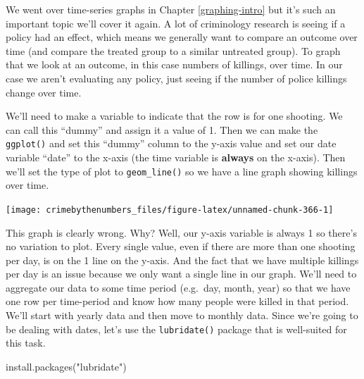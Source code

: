 \documentclass[
]{krantz}
\makeatletter
\newenvironment{Shaded}{\begin{snugshade}}{\end{snugshade}}
\newcommand{\AttributeTok}[1]{\textcolor[rgb]{0.61,0.61,0.61}{#1}}
\newcommand{\DecValTok}[1]{\textcolor[rgb]{0.06,0.06,0.06}{#1}}
\newcommand{\FunctionTok}[1]{\textcolor[rgb]{0,0,0}{#1}}
\newcommand{\NormalTok}[1]{#1}
\newcommand{\OtherTok}[1]{\textcolor[rgb]{0.37,0.37,0.37}{#1}}
\newcommand{\SpecialCharTok}[1]{\textcolor[rgb]{0,0,0}{#1}}
\newcommand{\StringTok}[1]{\textcolor[rgb]{0.5,0.5,0.5}{#1}}
\newenvironment{kframe}{%
\medskip{}
\setlength{\fboxsep}{.8em}
 \def\at@end@of@kframe{}%
 \ifinner\ifhmode%
  \def\at@end@of@kframe{\end{minipage}}%
  \begin{minipage}{\columnwidth}%
 \fi\fi%
 \def\FrameCommand##1{\hskip\@totalleftmargin \hskip-\fboxsep
 \colorbox{shadecolor}{##1}\hskip-\fboxsep
     \hskip-\linewidth \hskip-\@totalleftmargin \hskip\columnwidth}%
 \MakeFramed {\advance\hsize-\width
   \@totalleftmargin\z@ \linewidth\hsize
   \@setminipage}}%
 {\par\unskip\endMakeFramed%
 \at@end@of@kframe}
\renewenvironment{Shaded}{\begin{kframe}}{\end{kframe}}
\makeatother
\begin{document}
We went over time-series graphs in Chapter \ref{graphing-intro} but it's such an important topic we'll cover it again. A lot of criminology research is seeing if a policy had an effect, which means we generally want to compare an outcome over time (and compare the treated group to a similar untreated group). To graph that we look at an outcome, in this case numbers of killings, over time. In our case we aren't evaluating any policy, just seeing if the number of police killings change over time.

We'll need to make a variable to indicate that the row is for one shooting. We can call this ``dummy'' and assign it a value of 1. Then we can make the \texttt{ggplot()} and set this ``dummy'' column to the y-axis value and set our date variable ``date'' to the x-axis (the time variable is \textbf{always} on the x-axis). Then we'll set the type of plot to \texttt{geom\_line()} so we have a line graph showing killings over time.

\begin{Shaded}
\end{Shaded}

\begin{center}\texttt{[image: crimebythenumbers\_files/figure-latex/unnamed-chunk-366-1]} \end{center}

This graph is clearly wrong. Why? Well, our y-axis variable is always 1 so there's no variation to plot. Every single value, even if there are more than one shooting per day, is on the 1 line on the y-axis. And the fact that we have multiple killings per day is an issue because we only want a single line in our graph. We'll need to aggregate our data to some time period (e.g.~day, month, year) so that we have one row per time-period and know how many people were killed in that period. We'll start with yearly data and then move to monthly data. Since we're going to be dealing with dates, let's use the \texttt{lubridate()} package that is well-suited for this task.

\begin{Shaded}
\begin{Highlighting}[]
\FunctionTok{install.packages}\NormalTok{(}\StringTok{"lubridate"}\NormalTok{)}
\end{Highlighting}
\end{Shaded}
\end{document}
